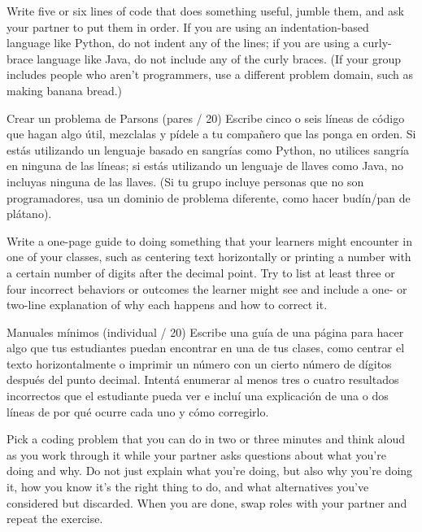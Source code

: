 
Write five or six lines of code that does something useful,
jumble them,
and ask your partner to put them in order.
If you are using an indentation-based language like Python,
do not indent any of the lines;
if you are using a curly-brace language like Java,
do not include any of the curly braces.
(If your group includes people who aren't programmers,
use a different problem domain,
such as making banana bread.)

Crear un problema de Parsons (pares / 20)
Escribe cinco o seis líneas de código que hagan algo útil, mezclalas y pídele a tu compañero que las ponga en orden. Si estás utilizando un lenguaje basado en sangrías como Python, no utilices sangría en ninguna de las líneas; si estás utilizando un lenguaje de llaves como Java, no incluyas ninguna de las llaves. (Si tu grupo incluye personas que no son programadores, usa un dominio de problema diferente, como hacer budín/pan de plátano).



Write a one-page guide to doing something that your learners might encounter in one of your classes,
such as centering text horizontally
or printing a number with a certain number of digits after the decimal point.
Try to list at least three or four incorrect behaviors or outcomes the learner might see
and include a one- or two-line explanation
of why each happens and how to correct it.

Manuales mínimos (individual / 20)
Escribe una guía de una página para hacer algo que tus estudiantes puedan encontrar en una de tus clases, como centrar el texto horizontalmente o imprimir un número con un cierto número de dígitos después del punto decimal. Intentá enumerar al menos tres o cuatro resultados incorrectos que el estudiante pueda ver e incluí una explicación de una o dos líneas de por qué ocurre cada uno y cómo corregirlo.



Pick a coding problem that you can do in two or three minutes
and think aloud as you work through it
while your partner asks questions about what you're doing and why.
Do not just explain what you're doing,
but also why you're doing it,
how you know it's the right thing to do,
and what alternatives you've considered but discarded.
When you are done,
swap roles with your partner and repeat the exercise.

